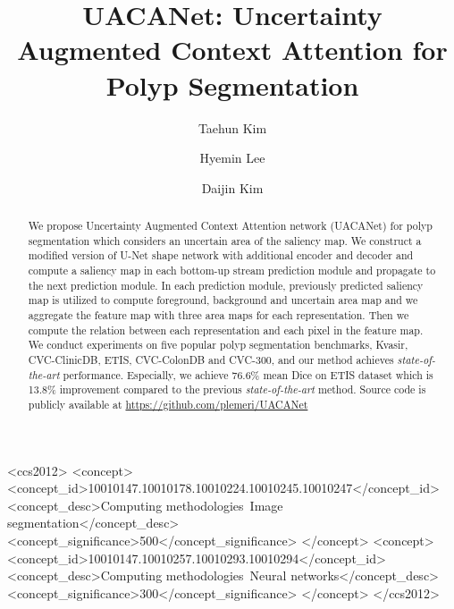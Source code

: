\documentclass[sigconf]{acmart}
\begin{document}
\fancyhead{}
\title{UACANet: Uncertainty Augmented Context Attention for Polyp Segmentation}

\author{Taehun Kim}

\author{Hyemin Lee}

\author{Daijin Kim}
\renewcommand{\shortauthors}{Kim, et al.}

\begin{abstract}
  We propose Uncertainty Augmented Context Attention network (UACANet) for polyp segmentation which considers an uncertain area of the saliency map. We construct a modified version of U-Net shape network with additional encoder and decoder and compute a saliency map in each bottom-up stream prediction module and propagate to the next prediction module. In each prediction module, previously predicted saliency map is utilized to compute foreground, background and uncertain area map and we aggregate the feature map with three area maps for each representation. Then we compute the relation between each representation and each pixel in the feature map. We conduct experiments on five popular polyp segmentation benchmarks, Kvasir, CVC-ClinicDB, ETIS, CVC-ColonDB and CVC-300, and our method achieves \textit{state-of-the-art} performance. Especially, we  achieve 76.6\% mean Dice on ETIS dataset which is 13.8\% improvement compared to the previous \textit{state-of-the-art} method. Source code is publicly available at \url{https://github.com/plemeri/UACANet}
\end{abstract}

\begin{CCSXML}
<ccs2012>
   <concept>
       <concept_id>10010147.10010178.10010224.10010245.10010247</concept_id>
       <concept_desc>Computing methodologies~Image segmentation</concept_desc>
       <concept_significance>500</concept_significance>
       </concept>
   <concept>
       <concept_id>10010147.10010257.10010293.10010294</concept_id>
       <concept_desc>Computing methodologies~Neural networks</concept_desc>
       <concept_significance>300</concept_significance>
       </concept>
 </ccs2012>
\end{CCSXML}
\end{document}
